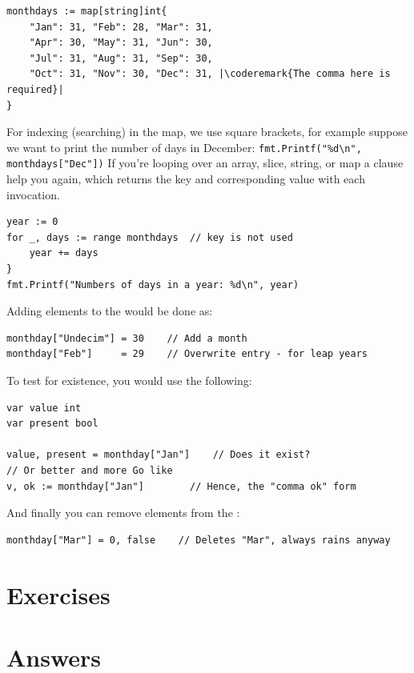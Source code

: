 \begin{lstlisting}
monthdays := map[string]int{
	"Jan": 31, "Feb": 28, "Mar": 31, 
	"Apr": 30, "May": 31, "Jun": 30, 
	"Jul": 31, "Aug": 31, "Sep": 30, 
	"Oct": 31, "Nov": 30, "Dec": 31, |\coderemark{The comma here is required}|
}		    
\end{lstlisting}
For indexing (searching) in the map, we use square brackets, for example
suppose we want to print the
number of days in December: \lstinline{fmt.Printf("%d\n", monthdays["Dec"])}\newline
If you're looping over an array, slice, string, or map a
clause help you again, which returns the key and corresponding value
with each invocation.
\begin{lstlisting}
year := 0
for _, days := range monthdays  // key is not used
    year += days
}
fmt.Printf("Numbers of days in a year: %d\n", year)
\end{lstlisting}
Adding elements to the  would be done as:
\begin{lstlisting}
monthday["Undecim"] = 30	// Add a month
monthday["Feb"]     = 29	// Overwrite entry - for leap years
\end{lstlisting}
To test for existence, you would use the
following\cite{go_course_day2}:
\begin{lstlisting}
var value int
var present bool

value, present = monthday["Jan"]	// Does it exist?
// Or better and more Go like
v, ok := monthday["Jan"]		// Hence, the "comma ok" form
\end{lstlisting}
And finally you can remove elements from the :
\begin{lstlisting}
monthday["Mar"] = 0, false    // Deletes "Mar", always rains anyway
\end{lstlisting}

\section{Exercises}







\cleardoublepage
\section{Answers}
\shipoutAnswer
